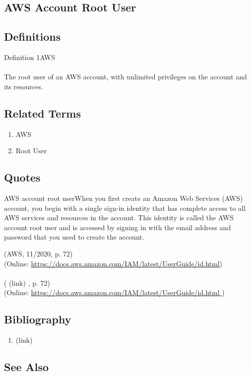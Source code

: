 \newpage \subsection*{AWS Account Root User } \subsection*{Definitions } \begin{DIC_Def}{Definition 1AWS }{} \paragraph{} The root user of an AWS account, with unlimited privileges on the account and its resources.  \end{DIC_Def} \subsection*{Related Terms } \begin{enumerate} \item  AWS  \item  Root User  \end{enumerate} \subsection*{Quotes } \begin{DIC_BlockQuote} AWS account root userWhen you first create an Amazon Web Services (AWS) account, you begin with a single sign-in identity that has complete access to all AWS services and resources in the account. This identity is called the AWS account root user and is accessed by signing in with the email address and password that you used to create the account.  \end{DIC_BlockQuote} (AWS, 11/2020, p. 72)\\ (Online: \url{https://docs.aws.amazon.com/IAM/latest/UserGuide/id.html})  \paragraph{} (  (link) \href{AWS, 11/2020 }{ } , p. 72)  \\  (Online:  \href{None }{https://docs.aws.amazon.com/IAM/latest/UserGuide/id.html } )  \subsection*{Bibliography } \begin{enumerate} \item  (link) \href{AWS, 11/2020 }{ }   \end{enumerate} \subsection*{See Also } 